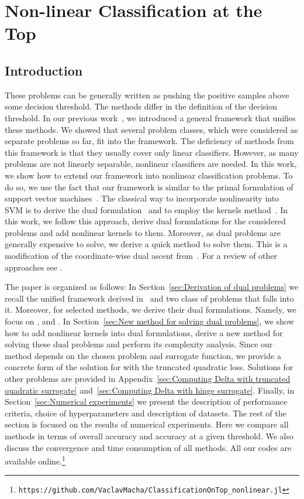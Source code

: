 \chapter{Non-linear Classification at the Top}

\section{Introduction}

These problems can be generally written as pushing the positive samples above some decision threshold. The methods differ in the definition of the decision threshold. In our previous work~\cite{adam2019patmat}, we introduced a general framework that unifies these methods. We showed that several problem classes, which were considered as separate problems so far, fit into the framework. The deficiency of methods from this framework is that they usually cover only linear classifiers. However, as many problems are not linearly separable, nonlinear classifiers are needed. In this work, we show how to extend our framework into nonlinear classification problems. To do so, we use the fact that our framework is similar to the primal formulation of support vector machines~\cite{cortes1995support}. The classical way to incorporate nonlinearity into SVM is to derive the dual formulation~\cite{boyd2004convex} and to employ the kernels method~\cite{scholkopf2001learning}. In this work, we follow this approach, derive dual formulations for the considered problems and add nonlinear kernels to them. Moreover, as dual problems are generally expensive to solve, we derive a quick method to solve them. This is a modification of the coordinate-wise dual ascent from~\cite{hsieh2008dual}. For a review of other approaches see \cite{batmaz2019review,werner2019review}.

The paper is organized as follows: In Section~\ref{sec:Derivation of dual problems} we recall the unified framework derived in~\cite{adam2019patmat} and two class of problems that falls into it. Moreover, for selected methods, we derive their dual formulations. Namely, we focus on \TopPush, \TopPushK and \PatMat. In Section~\ref{sec:New method for solving dual problems}, we show how to add nonlinear kernels into dual formulations, derive a new method for solving these dual problems and perform its complexity analysis. Since our method depends on the chosen problem and surrogate function, we provide a concrete form of the solution for \TopPushK with the truncated quadratic loss. Solutions for other problems are provided in Appendix~\ref{sec:Computing Delta with truncated quadratic surrogate} and~\ref{sec:Computing Delta with hinge surrogate}. Finally, in Section~\ref{sec:Numerical experiments} we present the description of performance criteria, choice of hyperparameters and description of datasets. The rest of the section is focused on the results of numerical experiments. Here we compare all methods in terms of overall accuracy and accuracy at a given threshold. We also discuss the convergence and time consumption of all methods. All our codes are available online.\footnote{\texttt{https://github.com/VaclavMacha/ClassificationOnTop\_nonlinear.jl}}

